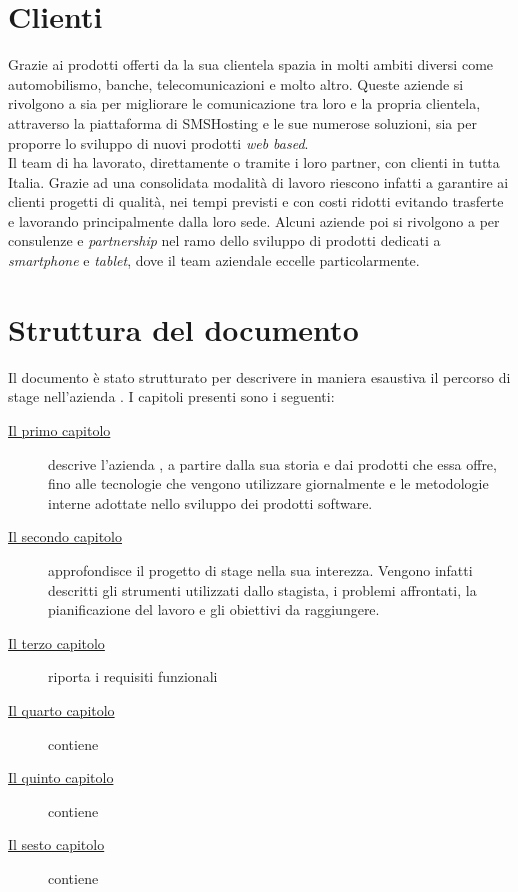 \section{Clienti}
Grazie ai prodotti offerti da \azienda{} la sua clientela spazia in molti ambiti diversi come automobilismo, banche, telecomunicazioni e molto altro. Queste aziende si rivolgono a \azienda{} sia per migliorare le comunicazione tra loro e la propria clientela, attraverso la piattaforma di SMSHosting e le sue numerose soluzioni, sia per proporre lo sviluppo di nuovi prodotti \emph{web based}. \\
Il team di \azienda{} ha lavorato, direttamente o tramite i loro partner, con clienti in tutta Italia. 
Grazie ad una consolidata modalità di lavoro riescono infatti a garantire ai clienti progetti di qualità, nei tempi previsti e con costi ridotti evitando trasferte e lavorando principalmente dalla loro sede. 
Alcuni aziende poi si rivolgono a \azienda per consulenze e \emph{partnership} nel ramo dello sviluppo di prodotti dedicati a \emph{smartphone} e \emph{tablet}, dove il team aziendale eccelle particolarmente.

\section{Struttura del documento}
Il documento è stato strutturato per descrivere in maniera esaustiva il percorso di stage nell'azienda \azienda{}. I capitoli presenti sono i seguenti:

\begin{description}
    \item[{\hyperref[cap:contesto-aziendale]{Il primo capitolo}}] descrive l'azienda \azienda{}, a partire dalla sua storia e dai prodotti che essa offre, fino alle tecnologie che vengono utilizzare giornalmente e le metodologie interne adottate nello sviluppo dei prodotti software. 
    
    \item[{\hyperref[cap:progetto-stage]{Il secondo capitolo}}] approfondisce il progetto di stage nella sua interezza. Vengono infatti descritti gli strumenti utilizzati dallo stagista, i problemi affrontati, la pianificazione del lavoro e gli obiettivi da raggiungere.
    
    \item[{\hyperref[cap:analisi]{Il terzo capitolo}}] riporta i requisiti funzionali 
    
    \item[{\hyperref[cap:progettazione]{Il quarto capitolo}}] contiene 
    
    \item[{\hyperref[cap:verfica]{Il quinto capitolo}}] contiene 
    
    \item[{\hyperref[cap:conclusioni]{Il sesto capitolo}}] contiene 

\end{description}

